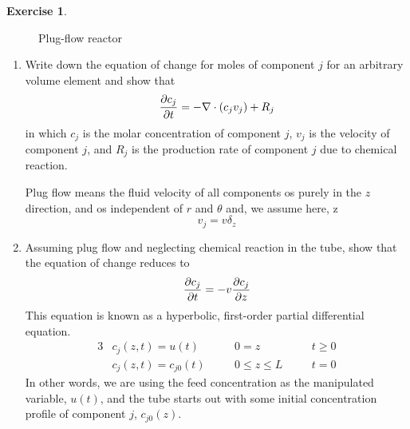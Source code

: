 \documentclass[11pt,a4paper]{report}
\theoremstyle{definition}\newtheorem{exercise}{Exercise}[chapter]
\begin{document}
\begin{exercise}
\begin{figure}
\caption{Plug-flow reactor}
\label{fig:exer2}
\end{figure}

\begin{enumerate}[label=(\alph*)]
    \item Write down the equation of change for moles of component $j$ for an arbitrary volume element and show that
    \begin{equation}
        \pdv{c_j}{t}=-\nabla \cdot (c_j v_j)+R_j
    \end{equation}
    in which $c_j$ is the molar concentration of component $j$, $v_j$ is the velocity of component $j$, and $R_j$ is the production rate of component $j$ due to chemical reaction.

    Plug flow means the fluid velocity of all components os purely in the $z$ direction, and os independent of $r$ and $\theta$ and, we assume here, z
    \begin{equation}
        v_j=v\delta_z
    \end{equation}
    
    \item Assuming plug flow and neglecting chemical reaction in the tube, show that the equation of change reduces to 
    \begin{equation}\label{equ:exer2}
        \pdv{c_j}{t}=-v\pdv{c_j}{z}
    \end{equation}
    This equation is known as a hyperbolic, first-order partial differential equation.
    \begin{alignat}{3}
        &c_j(z,t)=u(t) &&0=z &&t\ge 0  \\
        &c_j(z,t)=c_{j0}(t) \quad &&0\le z\le L\quad &&t=0 
    \end{alignat}
    In other words, we are using the feed concentration as the manipulated variable, $u(t)$, and the tube starts out with some initial concentration profile of component $j$, $c_{j0}(z)$.
    

\end{enumerate}
\end{exercise}
\end{document}
